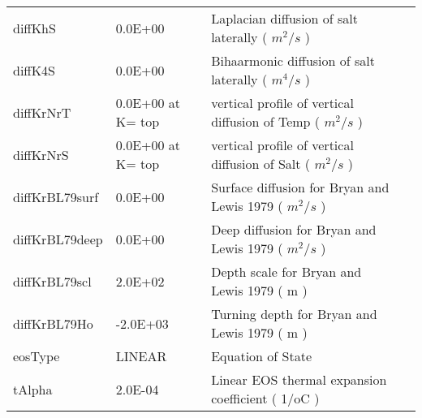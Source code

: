 \begin{table}
\begin{tabular}{lllc}
   diffKhS   &                   0.0E+00
    &   Laplacian diffusion of salt laterally ( $m^2/s$ ) 
    &  %
    \\
   diffK4S   &                   0.0E+00
    &   Bihaarmonic diffusion of salt laterally ( $m^4/s$ ) 
    &  %
    \\
   diffKrNrT   &      0.0E+00 at K= top
    &   vertical profile of vertical diffusion of Temp ( $m^2/s$ )
    &  %
    \\
   diffKrNrS   &      0.0E+00 at K= top
    &   vertical profile of vertical diffusion of Salt ( $m^2/s$ )
    &  %
    \\
   diffKrBL79surf   &                   0.0E+00
    &   Surface diffusion for Bryan and Lewis 1979 ( $m^2/s$ ) 
    &  %
    \\
   diffKrBL79deep   &                   0.0E+00
    &   Deep diffusion for Bryan and Lewis 1979 ( $m^2/s$ ) 
    &  %
    \\
   diffKrBL79scl   &                   2.0E+02
    &   Depth scale for Bryan and Lewis 1979 ( m ) 
    &  %
    \\
   diffKrBL79Ho   &                  -2.0E+03
    &   Turning depth for Bryan and Lewis 1979 ( m ) 
    &  %
    \\
   eosType   &  LINEAR 
    &   Equation of State
    &  %
    \\
   tAlpha   &                   2.0E-04
    &   Linear EOS thermal expansion coefficient ( 1/oC ) 
    &  %
    \\
\end{tabular}
\end{table}


